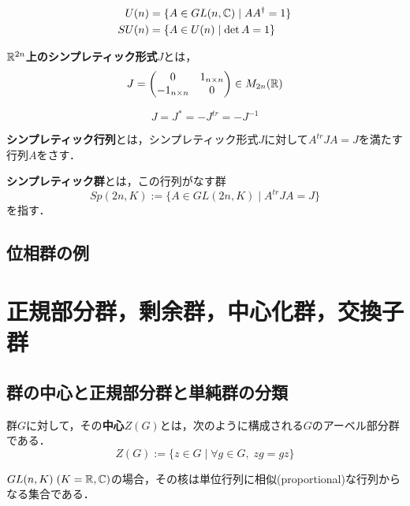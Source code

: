 \documentclass[uplatex,dvipdfmx]{jsreport}
\begin{document}
\begin{definition}
    \begin{align*}
        U(n) &= \{ A\in GL(n,\mathbb{C})\mid AA^\dagger =1\}\\
        SU(n) &= \{ A\in U(n)\mid \det A=1 \}
    \end{align*}
\end{definition}

\begin{definition}
    \textbf{$\mathbb{R}^{2n}$上のシンプレティック形式}$J$とは，
    \[ J=\begin{pmatrix}0&1_{n\times n}\\-1_{n\times n}&0\end{pmatrix}\in M_{2n}(\mathbb{R}) \]
\end{definition}
\begin{remark}
    \[ J=J^*=-J^{tr}=-J^{-1} \]
\end{remark}

\begin{definition}
    \textbf{シンプレティック行列}とは，シンプレティック形式$J$に対して$A^{tr}JA=J$を満たす行列$A$をさす．

    \textbf{シンプレティック群}とは，この行列がなす群
    \[ Sp(2n,K) := \{ A\in GL(2n,K)\mid A^{tr}JA=J \} \]
    を指す．
\end{definition}

\subsection{位相群の例}



\section{正規部分群，剰余群，中心化群，交換子群}

\subsection{群の中心と正規部分群と単純群の分類}

\begin{definition}[center]
    群$G$に対して，その\textbf{中心}$Z(G)$とは，次のように構成される$G$のアーベル部分群である．
    \[ Z(G) :=\{ z\in G\mid \forall g\in G,\; zg=gz \} \]
\end{definition}
\begin{example}
    $GL(n,K)\;(K=\mathbb{R},\mathbb{C})$の場合，その核は単位行列に相似(proportional)な行列からなる集合である．
\end{example}
\end{document}
